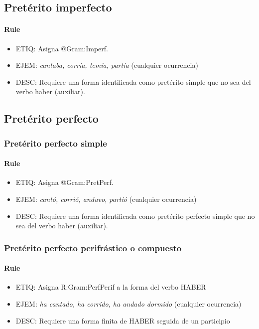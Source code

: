 \documentclass[11pt]{report}
\begin{document}
\subsection{Pretérito imperfecto}
\paragraph*{Rule}
\begin{itemize}
\item ETIQ: Asigna @Gram:Imperf.
\item EJEM: \emph{cantaba, corría, temía, partía} (cualquier ocurrencia)
\item DESC: Requiere una forma identificada como pretérito simple que no sea del verbo haber (auxiliar).
\end{itemize}

\subsection{Pretérito perfecto}
\subsubsection{Pretérito perfecto simple}
\paragraph*{Rule}
\begin{itemize}
\item ETIQ: Asigna @Gram:PretPerf.
\item EJEM: \emph{cantó, corrió, anduvo, partió} (cualquier ocurrencia)
\item DESC: Requiere una forma identificada como pretérito perfecto simple que no sea del verbo haber (auxiliar).
\end{itemize}

\subsubsection{Pretérito perfecto perifrástico o compuesto}\label{sec:HaberAuxPretPerfecto}
\paragraph*{Rule}
\begin{itemize}
\item ETIQ: Asigna R:Gram:PerfPerif a la forma del verbo HABER
\item EJEM: \emph{ha cantado, ha corrido, ha andado dormido} (cualquier ocurrencia)
\item DESC: Requiere una forma finita de HABER seguida de un participio
\end{itemize}
\end{document}
